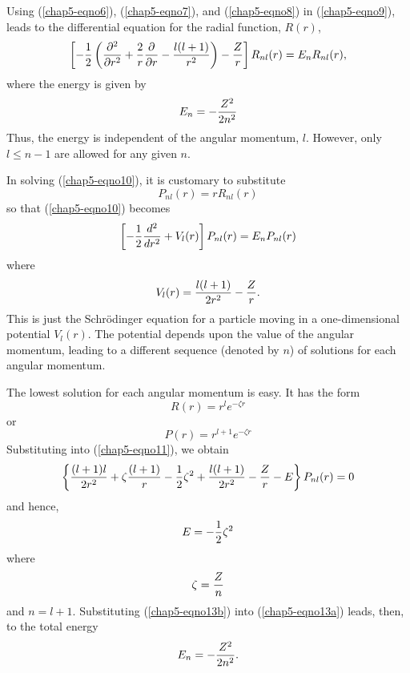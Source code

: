 Using (\ref{chap5-eqno6}), (\ref{chap5-eqno7}), and
(\ref{chap5-eqno8}) in (\ref{chap5-eqno9}), leads to the differential
equation for the radial function, $R(r)$,
\begin{equation}
\left[ - {1 \over 2} \left( {\partial^2 \over \partial r^2} + {2 \over r} 
{\partial \over \partial r} - {l(l+1) \over r^2} \right) - {Z \over r} 
\right] R_{nl} (r) = E_n R_{nl} (r),
\label{chap5-eqno10}
\end{equation}
where the energy is given by
\begin{equation}
E_n = - {Z^2 \over 2n^2}
\end{equation}
Thus, the energy is independent of the angular momentum, $l$.  However, 
only $l \leq n - 1$ are allowed for any given $n$.

In solving (\ref{chap5-eqno10}), it is customary to substitute
\begin{equation}
P_{nl} (r) = r R_{nl} (r)
\end{equation}
so that (\ref{chap5-eqno10}) becomes
\begin{equation}
\left[ - {1 \over 2} {d^2 \over dr^2} + V_l (r) \right] P_{nl} (r) = E_n 
P_{nl} (r)
\label{chap5-eqno11}
\end{equation}
where
\begin{equation}
V_l (r) = {l(l+1) \over 2r^2} - {Z \over r}.
\label{chap5-eqno12}
\end{equation}
This is just the Schr\"odinger equation for a particle moving in a 
one-dimensional potential $V_l(r)$.  The potential depends upon the value 
of the angular momentum, leading to a different sequence (denoted by $n$) 
of solutions for each angular momentum.

The lowest solution for each angular momentum is easy.  It has the form
\begin{equation}
R(r) = r^l e^{- \zeta r}
\end{equation}
or
\begin{equation}
P(r)  = r^{l+1} e^{- \zeta r}
\end{equation}
Substituting into (\ref{chap5-eqno11}), we obtain
\begin{equation}
\left\{ {(l+1)l \over 2r^2} + \zeta {(l+1) \over r} - {1 \over 2} 
\zeta^2 + {l(l+1) \over 2r^2} - {Z \over r} - E \right\} P_{nl}(r) = 0
\end{equation}
and hence,
\begin{equation}
E = - {1 \over 2} \zeta^2
\label{chap5-eqno13a}
\end{equation}
where
\begin{equation}
\zeta = {Z \over n}
\label{chap5-eqno13b}
\end{equation}
and $n = l + 1$.  Substituting (\ref{chap5-eqno13b}) into
(\ref{chap5-eqno13a}) leads, then, to the total energy
\begin{equation}
E_n = - {Z^2 \over 2n^2}.
\end{equation}

